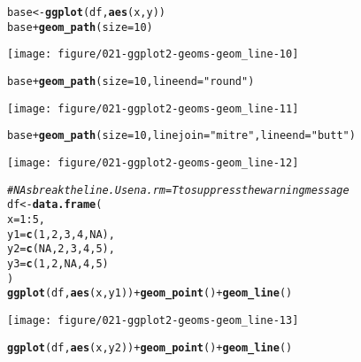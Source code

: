 \documentclass[a4paper,titlepage]{tufte-handout}\usepackage[]{graphicx}\usepackage[]{color}
\makeatletter
\def\maxwidth{ %
  \ifdim\Gin@nat@width>\linewidth
    \linewidth
  \else
    \Gin@nat@width
  \fi
}
\newcommand{\hlnum}[1]{\textcolor[rgb]{0.686,0.059,0.569}{#1}}%
\newcommand{\hlstr}[1]{\textcolor[rgb]{0.192,0.494,0.8}{#1}}%
\newcommand{\hlcom}[1]{\textcolor[rgb]{0.678,0.584,0.686}{\textit{#1}}}%
\newcommand{\hlopt}[1]{\textcolor[rgb]{0,0,0}{#1}}%
\newcommand{\hlstd}[1]{\textcolor[rgb]{0.345,0.345,0.345}{#1}}%
\newcommand{\hlkwb}[1]{\textcolor[rgb]{0.69,0.353,0.396}{#1}}%
\newcommand{\hlkwc}[1]{\textcolor[rgb]{0.333,0.667,0.333}{#1}}%
\newcommand{\hlkwd}[1]{\textcolor[rgb]{0.737,0.353,0.396}{\textbf{#1}}}%
\newenvironment{kframe}{%
 \def\at@end@of@kframe{}%
 \ifinner\ifhmode%
  \def\at@end@of@kframe{\end{minipage}}%
  \begin{minipage}{\columnwidth}%
 \fi\fi%
 \def\FrameCommand##1{\hskip\@totalleftmargin \hskip-\fboxsep
 \colorbox{shadecolor}{##1}\hskip-\fboxsep
     \hskip-\linewidth \hskip-\@totalleftmargin \hskip\columnwidth}%
 \MakeFramed {\advance\hsize-\width
   \@totalleftmargin\z@ \linewidth\hsize
   \@setminipage}}%
 {\par\unskip\endMakeFramed%
 \at@end@of@kframe}
\newenvironment{knitrout}{}{} %
\makeatother
\begin{document}
\begin{knitrout}
\begin{kframe}
\begin{alltt}
\hlstd{base} \hlkwb{<-} \hlkwd{ggplot}\hlstd{(df,} \hlkwd{aes}\hlstd{(x, y))}
\hlstd{base} \hlopt{+} \hlkwd{geom_path}\hlstd{(}\hlkwc{size} \hlstd{=} \hlnum{10}\hlstd{)}
\end{alltt}
\end{kframe}
\texttt{[image: figure/021-ggplot2-geoms-geom\_line-10]} 
\begin{kframe}\begin{alltt}
\hlstd{base} \hlopt{+} \hlkwd{geom_path}\hlstd{(}\hlkwc{size} \hlstd{=} \hlnum{10}\hlstd{,} \hlkwc{lineend} \hlstd{=} \hlstr{"round"}\hlstd{)}
\end{alltt}
\end{kframe}
\texttt{[image: figure/021-ggplot2-geoms-geom\_line-11]} 
\begin{kframe}\begin{alltt}
\hlstd{base} \hlopt{+} \hlkwd{geom_path}\hlstd{(}\hlkwc{size} \hlstd{=} \hlnum{10}\hlstd{,} \hlkwc{linejoin} \hlstd{=} \hlstr{"mitre"}\hlstd{,} \hlkwc{lineend} \hlstd{=} \hlstr{"butt"}\hlstd{)}
\end{alltt}
\end{kframe}
\texttt{[image: figure/021-ggplot2-geoms-geom\_line-12]} 
\begin{kframe}\begin{alltt}
\hlcom{# NAs break the line. Use na.rm = T to suppress the warning message}
\hlstd{df} \hlkwb{<-} \hlkwd{data.frame}\hlstd{(}
  \hlkwc{x} \hlstd{=} \hlnum{1}\hlopt{:}\hlnum{5}\hlstd{,}
  \hlkwc{y1} \hlstd{=} \hlkwd{c}\hlstd{(}\hlnum{1}\hlstd{,} \hlnum{2}\hlstd{,} \hlnum{3}\hlstd{,} \hlnum{4}\hlstd{,} \hlnum{NA}\hlstd{),}
  \hlkwc{y2} \hlstd{=} \hlkwd{c}\hlstd{(}\hlnum{NA}\hlstd{,} \hlnum{2}\hlstd{,} \hlnum{3}\hlstd{,} \hlnum{4}\hlstd{,} \hlnum{5}\hlstd{),}
  \hlkwc{y3} \hlstd{=} \hlkwd{c}\hlstd{(}\hlnum{1}\hlstd{,} \hlnum{2}\hlstd{,} \hlnum{NA}\hlstd{,} \hlnum{4}\hlstd{,} \hlnum{5}\hlstd{)}
\hlstd{)}
\hlkwd{ggplot}\hlstd{(df,} \hlkwd{aes}\hlstd{(x, y1))} \hlopt{+} \hlkwd{geom_point}\hlstd{()} \hlopt{+} \hlkwd{geom_line}\hlstd{()}
\end{alltt}


{\ttfamily\noindent\color{warningcolor}{\#\# Warning: Removed 1 rows containing missing values (geom\_point).}}

{\ttfamily\noindent\color{warningcolor}{\#\# Warning: Removed 1 rows containing missing values (geom\_path).}}\end{kframe}
\texttt{[image: figure/021-ggplot2-geoms-geom\_line-13]} 
\begin{kframe}\begin{alltt}
\hlkwd{ggplot}\hlstd{(df,} \hlkwd{aes}\hlstd{(x, y2))} \hlopt{+} \hlkwd{geom_point}\hlstd{()} \hlopt{+} \hlkwd{geom_line}\hlstd{()}
\end{alltt}



\end{kframe}
\end{knitrout}
\end{document}
